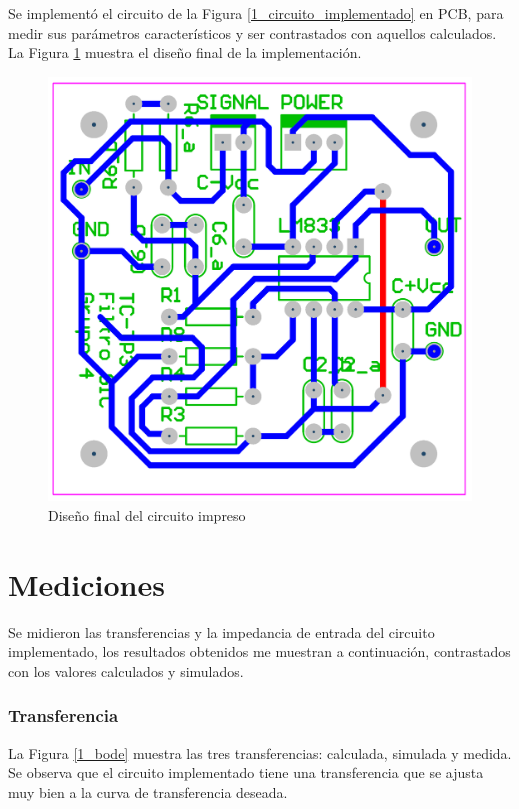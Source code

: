 Se implementó el circuito de la Figura \ref{1_circuito_implementado} en PCB, para medir sus parámetros característicos y ser contrastados con aquellos calculados. La Figura \ref{1_pcb} muestra el diseño final de la implementación. 

\begin{figure}[ht]
\centering
\includegraphics[scale=0.4]{resources/pcb}
\caption{Diseño final del circuito impreso}
\label{1_pcb}
\end{figure}

\section{Mediciones}
Se midieron las transferencias y la impedancia de entrada del circuito implementado, los resultados obtenidos me muestran a continuación, contrastados con los valores calculados y simulados.

\subsubsection{Transferencia}
La Figura \ref{1_bode} muestra las tres transferencias: calculada, simulada y medida. Se observa que el circuito implementado tiene una transferencia que se ajusta muy bien a la curva de transferencia deseada.

